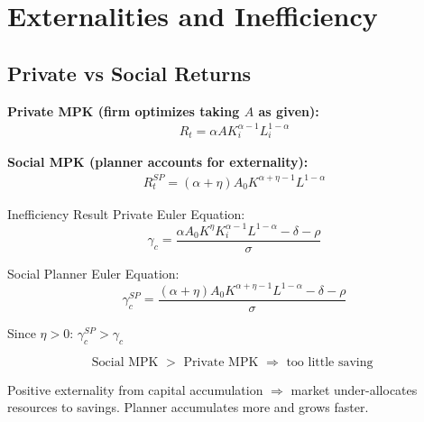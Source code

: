 \documentclass[a4paper,11pt]{article}
\begin{document}
\clearpage

\section{Externalities and Inefficiency}

\subsection*{Private vs Social Returns}

\medskip
\noindent\textbf{Private MPK (firm optimizes taking $A$ as given):}
\begin{align*}
R_t = \alpha A K_i^{\alpha-1} L_i^{1-\alpha}
\tag{Private MPK}
\end{align*}

\medskip
\noindent\textbf{Social MPK (planner accounts for externality):}
\begin{align*}
R_t^{SP} = (\alpha + \eta) A_0 K^{\alpha+\eta-1} L^{1-\alpha}
\tag{Social MPK}
\end{align*}

\begin{derivationbox}{Inefficiency Result}
Private Euler Equation:
\[
\gamma_c = \frac{\alpha A_0 K^\eta K_i^{\alpha-1} L^{1-\alpha} - \delta - \rho}{\sigma}
\]

Social Planner Euler Equation:
\[
\gamma_c^{SP} = \frac{(\alpha+\eta) A_0 K^{\alpha+\eta-1} L^{1-\alpha} - \delta - \rho}{\sigma}
\]

Since $\eta > 0$: $\gamma_c^{SP} > \gamma_c$
\end{derivationbox}

\begin{resultbox}
\[
\boxed{\text{Social MPK } > \text{ Private MPK } \Rightarrow \text{ too little saving }}
\tag{Inefficiency}
\]
\end{resultbox}

\medskip
\begin{tcolorbox}[colback=red!10,colframe=red!60,title=Policy Implication]
Positive externality from capital accumulation $\Rightarrow$ market under-allocates resources to savings. Planner accumulates more and grows faster.
\end{tcolorbox}

\clearpage

\end{document}

